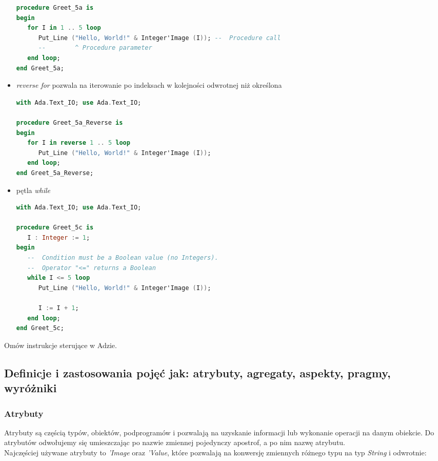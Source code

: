 \documentclass[a4paper,15pt]{article}
\newcommand{\ask}[2]{
    \begin{tcolorbox}[colback=black!5!white,colframe=gray,title={Pytanie #1}]
        #2
    \end{tcolorbox}
}
\begin{document}
\begin{itemize}
\begin{lstlisting}[language=Ada, caption=Podstawowa petla for]
procedure Greet_5a is
begin
   for I in 1 .. 5 loop
      Put_Line ("Hello, World!" & Integer'Image (I)); --  Procedure call
      --        ^ Procedure parameter
   end loop;
end Greet_5a;
\end{lstlisting}

\item \textit{reverse for} pozwala na iterowanie po indeksach w kolejności odwrotnej niż określona
\begin{lstlisting}[language=Ada, caption=reverse for]
with Ada.Text_IO; use Ada.Text_IO;

procedure Greet_5a_Reverse is
begin
   for I in reverse 1 .. 5 loop
      Put_Line ("Hello, World!" & Integer'Image (I));
   end loop;
end Greet_5a_Reverse;
\end{lstlisting}

\item pętla \textit{while}

\begin{lstlisting}[language=Ada, caption=while]
with Ada.Text_IO; use Ada.Text_IO;

procedure Greet_5c is
   I : Integer := 1;
begin
   --  Condition must be a Boolean value (no Integers).
   --  Operator "<=" returns a Boolean
   while I <= 5 loop
      Put_Line ("Hello, World!" & Integer'Image (I));

      I := I + 1;
   end loop;
end Greet_5c;
\end{lstlisting}


\end{itemize}

\ask{}{
Omów instrukcje sterujące w Adzie.
}




\subsection{Definicje i zastosowania pojęć jak: atrybuty, agregaty, aspekty, pragmy, wyróżniki}

\subsubsection{Atrybuty}

Atrybuty są częścią typów, obiektów, podprogramów i pozwalają na uzyskanie informacji lub wykonanie operacji na danym obiekcie. Do atrybutów odwołujemy się umieszczając po nazwie zmiennej pojedynczy apostrof, a po nim nazwę atrybutu. \\
Najczęściej używane atrybuty to \textit{'Image} oraz \textit{'Value}, które pozwalają na konwersję zmiennych różnego typu na typ \textit{String} i odwrotnie:
\end{document}
